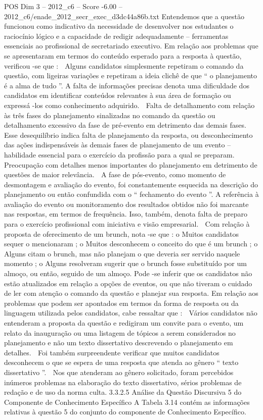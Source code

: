 \begin{textsample}{POS Dim 3 – 2012\_c6 – Score -6.00 – 2012\_c6/enade\_2012\_secr\_exec\_d3dc44a86b.txt}
Entendemos que a questão funcionou como indicativo da necessidade de desenvolver nos estudantes o raciocínio lógico e a capacidade de redigir adequadamente – ferramentas essenciais ao profissional de secretariado executivo.
Em relação aos problemas que se apresentaram em termos do conteúdo esperado para a resposta à questão, verificou -se que :  Alguns candidatos simplesmente repetiram o comando da questão, com ligeiras variações e repetiram a ideia clichê de que “ o planejamento é a alma de tudo ”.
A falta de informações precisas denota uma dificuldade dos candidatos em identificar conteúdos relevantes à sua área de formação ou expressá -los como conhecimento adquirido.  Falta de detalhamento com relação às três fases do planejamento sinalizadas no comando da questão ou detalhamento excessivo da fase de pré-evento em detrimento das demais fases.
Esse desequilíbrio indica falta de planejamento da resposta, ou desconhecimento das ações indispensáveis às demais fases de planejamento de um evento – habilidade essencial para o exercício da profissão para a qual se preparam.  Preocupação com detalhes menos importantes do planejamento em detrimento de questões de maior relevância.  A fase de pós-evento, como momento de desmontagem e avaliação do evento, foi constantemente esquecida na descrição do planejamento ou então confundida com o “ fechamento do evento ”.
A referência à avaliação do evento ou monitoramento dos resultados obtidos não foi marcante nas respostas, em termos de frequência.
Isso, também, denota falta de preparo para o exercício profissional com iniciativa e visão empresarial.  Com relação à proposta de oferecimento de um brunch, nota -se que : o Muitos candidatos sequer o mencionaram ; o Muitos desconhecem o conceito do que é um brunch ; o Alguns citam o brunch, mas não planejam o que deveria ser servido naquele momento ; o Alguns resolveram sugerir que o brunch fosse substituído por um almoço, ou então, seguido de um almoço.
Pode -se inferir que os candidatos não estão atualizados em relação a opções de eventos, ou que não tiveram o cuidado de ler com atenção o comando da questão e planejar sua resposta.
Em relação aos problemas que podem ser apontados em termos da forma de resposta ou da linguagem utilizada pelos candidatos, cabe ressaltar que :  Vários candidatos não entenderam a proposta da questão e redigiram um convite para o evento, um relato da inauguração ou uma listagem de tópicos a serem considerados no planejamento e não um texto dissertativo descrevendo o planejamento em detalhes.  Foi também surpreendente verificar que muitos candidatos desconhecem o que se espera de uma resposta que atenda ao gênero “ texto dissertativo ”.  Nos que atenderam ao gênero solicitado, foram percebidos inúmeros problemas na elaboração do texto dissertativo, sérios problemas de redação e de uso da norma culta. 3.3.2.5 Análise da Questão Discursiva 5 do Componente de Conhecimento Específico A Tabela 3.14 contém as informações relativas à questão 5 do conjunto do componente de Conhecimento Específico.

\end{textsample}
